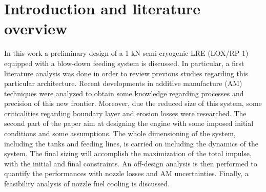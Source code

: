 \section{Introduction and literature overview}
\label{sec:introduction}
In this work a preliminary design of a 1 kN semi-cryogenic LRE (LOX/RP-1) equipped with a blow-down feeding system is discussed. In particular, a first literature analysis was done in order to review previous studies regarding this particular architecture. Recent developments in additive manufacture (AM) techniques were analyzed to obtain some knowledge regarding processes and precision of this new frontier. Moreover, due the reduced size of this system, some criticalities regarding boundary layer and erosion losses were researched.
The second part of the paper aim at designing the engine with some imposed initial conditions and some assumptions. The whole dimensioning of the system, including the tanks and feeding lines, is carried on including the dynamics of the system. The final sizing will accomplish the maximization of the total impulse, with the initial and final constraints. 
An off-design analysis is then performed to quantify the performances with nozzle losses and AM uncertainties. Finally, a feasibility analysis of  nozzle fuel cooling is discussed. 

